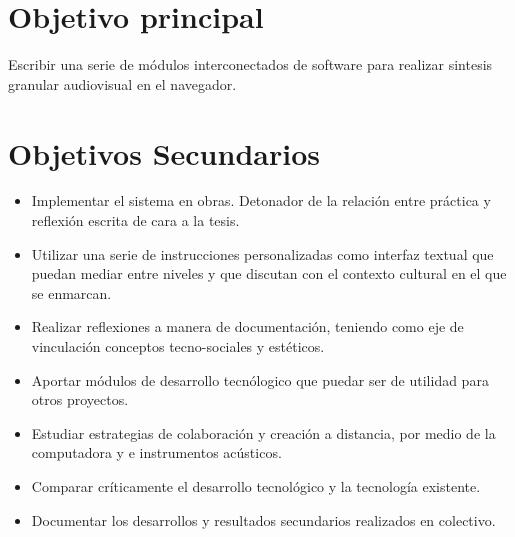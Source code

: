 \section*{Objetivo principal}

Escribir una serie de módulos interconectados de software para realizar sintesis granular audiovisual en el navegador.

\section*{Objetivos Secundarios}

\begin{itemize}

\item Implementar el sistema en obras. Detonador de la relación entre práctica y reflexión escrita de cara a la tesis.
\item Utilizar una serie de instrucciones personalizadas como interfaz textual que puedan mediar entre niveles y que discutan con el contexto cultural en el que se enmarcan.
\item Realizar reflexiones a manera de documentación, teniendo como eje de vinculación conceptos tecno-sociales y estéticos.
\item Aportar módulos de desarrollo tecnólogico que puedar ser de utilidad para otros proyectos.
\item Estudiar estrategias de colaboración y creación a distancia, por medio de la computadora y e instrumentos acústicos.
\item Comparar críticamente el desarrollo tecnológico y la tecnología existente.
\item Documentar los desarrollos y resultados secundarios realizados en colectivo.

\end{itemize}
